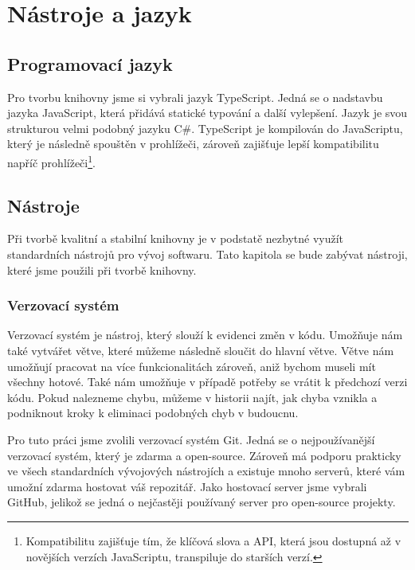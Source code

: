 \chapter{Nástroje a jazyk}
\label{chap:technologies}

\section{Programovací jazyk}
\label{sec:programming-language}

Pro tvorbu knihovny jsme si vybrali jazyk TypeScript\cite{geometryjs:wiki:technologies}. 
Jedná se o nadstavbu jazyka JavaScript, která přidává statické typování a další vylepšení\cite{TypeScript:handbook}. 
Jazyk je svou strukturou velmi podobný jazyku C\#.
TypeScript je kompilován do JavaScriptu\cite{TypeScript}, který je následně spouštěn v prohlížeči, zároveň zajišťuje lepší kompatibilitu napříč prohlížeči\footnote{Kompatibilitu zajišťuje tím, že klíčová slova a API, která jsou dostupná až v novějších verzích JavaScriptu, transpiluje do starších verzí.}\cite{TypeScript:tsconfig}.

\section{Nástroje}
\label{sec:tools}

Při tvorbě kvalitní a stabilní knihovny je v podstatě nezbytné využít standardních nástrojů pro vývoj softwaru. 
Tato kapitola se bude zabývat nástroji, které jsme použili při tvorbě knihovny.

\subsection{Verzovací systém}
\label{subsec:version-control}

Verzovací systém je nástroj, který slouží k evidenci změn v kódu. 
Umožňuje nám také vytvářet větve, které můžeme následně sloučit do hlavní větve\cite{Git:branches,wikipedia:version-control}. 
Větve nám umožňují pracovat na více funkcionalitách zároveň, aniž bychom museli mít všechny hotové. 
Také nám umožňuje v případě potřeby se vrátit k předchozí verzi kódu.
Pokud nalezneme chybu, můžeme v historii najít, jak chyba vznikla a podniknout kroky k eliminaci podobných chyb v budoucnu.

Pro tuto práci jsme zvolili verzovací systém Git. Jedná se o nejpoužívanější verzovací systém, který je zdarma a open-source\cite{Git,geometryjs:wiki:technologies}.
Zároveň má podporu prakticky ve všech standardních vývojových nástrojích a existuje mnoho serverů, které vám umožní zdarma hostovat váš repozitář.
Jako hostovací server jsme vybrali GitHub, jelikož se jedná o nejčastěji používaný server pro open-source projekty\cite{GitHub:about}.

